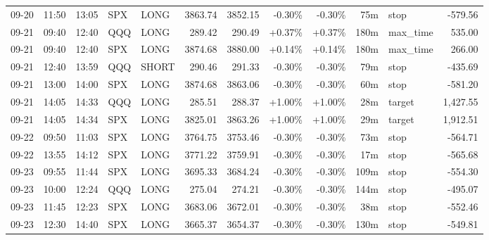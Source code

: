 \documentclass[11pt,a4paper]{article}
\begin{document}
\begin{center}
\begin{longtable}{>{\color{txtmain}}l l l l l r r r r r >{\color{txtmain}}l r}
09-20 & 11:50 & 13:05 & SPX & LONG & 3863.74 & 3852.15 & \textcolor{lossred}{-0.30\%} & \textcolor{lossred}{-0.30\%} & 75m & stop & \textcolor{lossred}{-579.56} \\
09-21 & 09:40 & 12:40 & QQQ & LONG & 289.42 & 290.49 & \textcolor{wingreen}{+0.37\%} & \textcolor{wingreen}{+0.37\%} & 180m & max\_time & \textcolor{wingreen}{535.00} \\
09-21 & 09:40 & 12:40 & SPX & LONG & 3874.68 & 3880.00 & \textcolor{wingreen}{+0.14\%} & \textcolor{wingreen}{+0.14\%} & 180m & max\_time & \textcolor{wingreen}{266.00} \\
09-21 & 12:40 & 13:59 & QQQ & SHORT & 290.46 & 291.33 & \textcolor{lossred}{-0.30\%} & \textcolor{lossred}{-0.30\%} & 79m & stop & \textcolor{lossred}{-435.69} \\
09-21 & 13:00 & 14:00 & SPX & LONG & 3874.68 & 3863.06 & \textcolor{lossred}{-0.30\%} & \textcolor{lossred}{-0.30\%} & 60m & stop & \textcolor{lossred}{-581.20} \\
09-21 & 14:05 & 14:33 & QQQ & LONG & 285.51 & 288.37 & \textcolor{wingreen}{+1.00\%} & \textcolor{wingreen}{+1.00\%} & 28m & target & \textcolor{wingreen}{1,427.55} \\
09-21 & 14:05 & 14:34 & SPX & LONG & 3825.01 & 3863.26 & \textcolor{wingreen}{+1.00\%} & \textcolor{wingreen}{+1.00\%} & 29m & target & \textcolor{wingreen}{1,912.51} \\
09-22 & 09:50 & 11:03 & SPX & LONG & 3764.75 & 3753.46 & \textcolor{lossred}{-0.30\%} & \textcolor{lossred}{-0.30\%} & 73m & stop & \textcolor{lossred}{-564.71} \\
09-22 & 13:55 & 14:12 & SPX & LONG & 3771.22 & 3759.91 & \textcolor{lossred}{-0.30\%} & \textcolor{lossred}{-0.30\%} & 17m & stop & \textcolor{lossred}{-565.68} \\
09-23 & 09:55 & 11:44 & SPX & LONG & 3695.33 & 3684.24 & \textcolor{lossred}{-0.30\%} & \textcolor{lossred}{-0.30\%} & 109m & stop & \textcolor{lossred}{-554.30} \\
09-23 & 10:00 & 12:24 & QQQ & LONG & 275.04 & 274.21 & \textcolor{lossred}{-0.30\%} & \textcolor{lossred}{-0.30\%} & 144m & stop & \textcolor{lossred}{-495.07} \\
09-23 & 11:45 & 12:23 & SPX & LONG & 3683.06 & 3672.01 & \textcolor{lossred}{-0.30\%} & \textcolor{lossred}{-0.30\%} & 38m & stop & \textcolor{lossred}{-552.46} \\
09-23 & 12:30 & 14:40 & SPX & LONG & 3665.37 & 3654.37 & \textcolor{lossred}{-0.30\%} & \textcolor{lossred}{-0.30\%} & 130m & stop & \textcolor{lossred}{-549.81} \\

\end{longtable}
\end{center}
\end{document}
